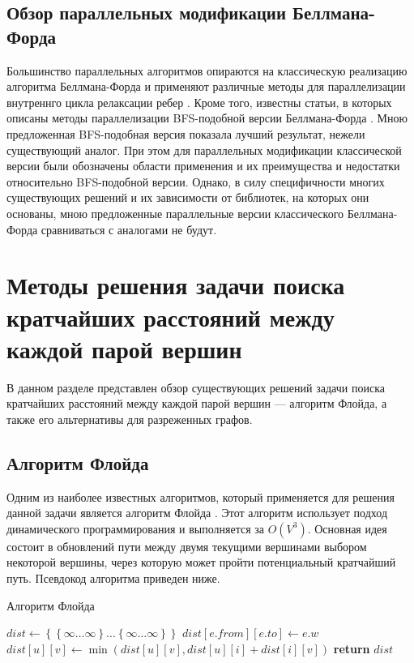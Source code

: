 \FloatBarrier
\subsection{Обзор параллельных модификации Беллмана-Форда}

Большинство параллельных алгоритмов опираются на классическую реализацию алгоритма Беллмана-Форда и применяют различные методы для параллелизации внутреннго цикла релаксации ребер \cite{COHEN}\cite{GAURAV}. Кроме того, известны статьи, в которых описаны методы параллелизации BFS-подобной версии Беллмана-Форда \cite{LIGRA}. Мною предложенная BFS-подобная версия показала лучший результат, нежели существующий аналог. При этом для параллельных модификации классической версии были обозначены области применения и их преимущества и недостатки относительно BFS-подобной версии. Однако, в силу специфичности многих существующих решений и их зависимости от библиотек, на которых они основаны, мною предложенные параллельные версии классического Беллмана-Форда сравниваться с аналогами не будут. 


\FloatBarrier
\section{Методы решения задачи поиска кратчайших расстояний между каждой парой вершин}
В данном разделе представлен обзор существующих решений задачи поиска кратчайших расстояний между каждой парой вершин --- алгоритм Флойда, а также его альтернативы для разреженных графов.
\subsection{Алгоритм Флойда}
Одним из наиболее известных алгоритмов, который применяется для решения данной задачи является алгоритм Флойда \cite{CORMEN}. Этот алгоритм использует подход динамического программирования и выполняется за $O(V^3)$. Основная идея состоит в обновлений пути между двумя текущими вершинами выбором некоторой вершины, через которую может пройти потенциальный кратчайший путь. Псевдокод алгоритма приведен ниже. 

\FloatBarrier
\begin{algorithm}
\caption{Алгоритм Флойда}\label{floyd}
\begin{algorithmic}[1]
\State $dist\gets \left\{ {   \left\{ {\infty \ldots \infty}\right\}  \ldots \left\{ {\infty \ldots \infty}\right\} }\right\}$
	\State $dist[e.from][e.to] \gets e.w$
\EndFor 
\State
{}
			\State $dist[u][v] \gets \min(dist[u][v], dist[u][i] + dist[i][v])$
		\EndFor
	\EndFor
\EndFor
\State \textbf{return} $dist$
\EndProcedure
\end{algorithmic}
\end{algorithm}


